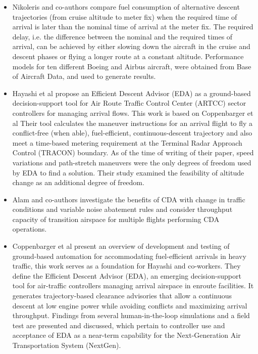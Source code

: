 \documentclass{aer1315-pretty}
\begin{document}
\begin{itemize}
\item Nikoleris and co-authors \cite{Niko:2012} compare fuel consumption of alternative descent trajectories (from cruise altitude to meter fix) when the required time of arrival is later than the nominal time of arrival at the meter fix. The required delay, i.e. the difference between the nominal and the required times of arrival, can be achieved by either slowing down the aircraft in the cruise and descent phases or flying a longer route at a constant altitude. Performance models for ten different Boeing and Airbus aircraft, were obtained from Base of Aircraft Data, and used to generate results. 

\item Hayashi et al \cite{Hayashi:2011} propose an Efficient Descent Advisor (EDA) as a ground-based decision-support tool for Air Route Traffic Control Center (ARTCC) sector controllers for managing arrival flows. This work is based on Coppenbarger et al \cite{Copp:2010b} Their tool calculates the maneuver instructions for an arrival flight to fly a conflict-free (when able), fuel-efficient, continuous-descent trajectory and also meet a time-based metering requirement at the Terminal Radar Approach Control (TRACON) boundary. As of the time of writing of their paper, speed variations and path-stretch maneuvers were the only degrees of freedom used by EDA to find a solution. Their study examined the feasibility of altitude change as an additional degree of freedom. 

\item Alam and co-authors \cite{Alam:2010} investigate the benefits of CDA with change in traffic conditions and variable noise abatement rules and consider throughput capacity of transition airspace for multiple flights performing CDA operations.


\item Coppenbarger et al \cite{Copp:2010b} present an overview of development and testing of ground-based automation for accommodating fuel-efficient arrivals in heavy traffic, this work serves as a foundation for Hayashi and co-workers\cite{Hayashi:2011}. They define the Efficient Descent Advisor (EDA), an emerging decision-support tool for air-traffic controllers managing arrival airspace in enroute facilities. It generates trajectory-based clearance advisories that allow a continuous descent at low engine power while avoiding conflicts and maximizing arrival throughput. Findings from several human-in-the-loop simulations and a field test are presented and discussed, which pertain to controller use and acceptance of EDA as a near-term capability for the Next-Generation Air Transportation System (NextGen).

\end{itemize}
\end{document}
